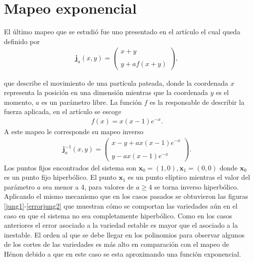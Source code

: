 \label{jung-seccion}\section{Mapeo exponencial}
El último mapeo que se estudió fue uno presentado en el artículo \citep{Jung} el cual queda definido por 
\begin{eqnarray}
\mathbf{j}_{a}(x,y)=\left(\begin{array}{lcc}
             x+y\\
             \\ y+af(x+y)
             \end{array}\right),
\label{Jung}
\end{eqnarray}

que describe el movimiento de una partícula pateada, donde la coordenada $x$ representa la posición en una dimensión mientras que la coordenada $y$ es el momento, $a$ es un parámetro libre. La función $f$ es la responsable de describir la fuerza aplicada, en el artículo \cite{Jung} se escoge
\begin{eqnarray*}
f(x)=x(x-1)e^{-x}.
\end{eqnarray*}
A este mapeo le corresponde su mapeo inverso
\begin{eqnarray}
\mathbf{j}^{-1}_{a}(x,y)=\left(\begin{array}{lcc}
             x-y+ax(x-1)e^{-x}\\
             \\ y-ax(x-1)e^{-x}
             \end{array}\right).
             \label{jungI}
\end{eqnarray}
Los puntos fijos encontrados del sistema son $\mathbf{x}_{0}=(1,0), \mathbf{x}_{1}=(0,0)$ donde $\mathbf{x}_{0}$ es un punto fijo hiperbólico. El punto $\mathbf{x}_{1}$ es un punto elíptico mientras el valor del parámetro $a$ sea menor a 4, para valores de $a \geq 4$ se torna inverso hiperbólico.\\

Aplicando el mismo mecanismo que en los casos pasados se obtuvieron las figuras \ref{jung1}-\ref{errorjung2} que muestran cómo se comportan las variedades aún en el caso en que el sistema no sea completamente hiperbólico. Como en los casos anteriores el error asociado a la variedad estable es mayor que el asociado a la inestable. El orden al que se debe llegar en los polinomios para observar algunos de los cortes de las variedades es más alto en comparación con el mapeo de Hénon debido a que en este caso se esta aproximando una función exponencial.

